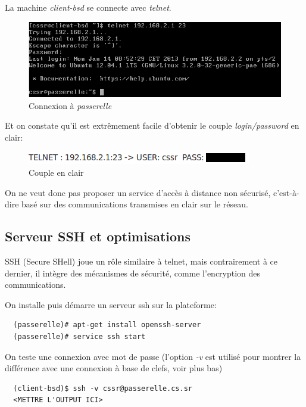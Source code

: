 \documentclass[a4paper]{article}
\begin{document}
La machine \textit{client-bsd} se connecte avec \textit{telnet}.

\begin{figure}[!ht]
	\centering
	\includegraphics[scale=.5]{Telnet.PNG}
	\caption{\label{hosts} Connexion à \textit{passerelle}}
\end{figure}

Et on constate qu'il est extrêmement facile d'obtenir le couple \textit{login/password} en clair:

\begin{figure}[!ht]
	\centering
	\includegraphics[scale=.5]{Telnet_passwd.png}
	\caption{\label{hosts} Couple en clair}
\end{figure}

On ne veut donc pas proposer un service d'accès à distance non sécurisé, c'est-à-dire
basé sur des communications transmises en clair sur le réseau. 

 
\subsection{Serveur SSH  et optimisations}
SSH (Secure SHell) joue un rôle similaire à telnet, mais contrairement à ce
dernier, il intègre des mécanismes de sécurité, comme l'encryption des
communications.

On installe puis démarre un serveur ssh sur la plateforme:
\begin{verbatim}
  (passerelle)# apt-get install openssh-server
  (passerelle)# service ssh start
\end{verbatim}

On teste une connexion avec mot de passe (l'option \textit{-v} est
utilisé pour montrer la différence avec une connexion à base de
clefs, voir plus bas)
\begin{verbatim}
  (client-bsd)$ ssh -v cssr@passerelle.cs.sr
  <METTRE L'OUTPUT ICI>
\end{verbatim}
\end{document}
